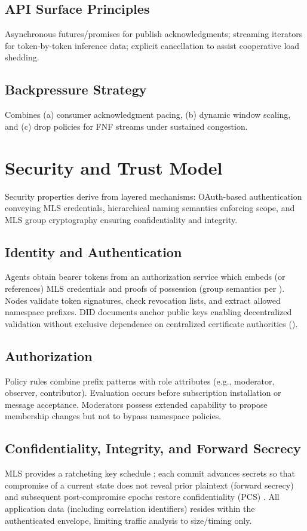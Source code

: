 \documentclass{article}
\theoremstyle{definition}
\theoremstyle{remark}
\begin{document}
\subsection{API Surface Principles}
Asynchronous futures/promises for publish acknowledgments; streaming iterators
for token-by-token inference data; explicit cancellation to assist cooperative
load shedding.
\subsection{Backpressure Strategy}
Combines (a) consumer acknowledgment pacing, (b) dynamic window scaling, and
(c) drop policies for FNF streams under sustained congestion.

\section{Security and Trust Model}\label{sec:security}
Security properties derive from layered mechanisms: OAuth-based authentication
conveying MLS credentials, hierarchical naming semantics enforcing scope, and
MLS group cryptography ensuring confidentiality and integrity.
\subsection{Identity and Authentication}
Agents obtain bearer tokens from an authorization service which embeds (or
references) MLS credentials and proofs of possession (group semantics per
\citep{rfc9420}). Nodes validate token signatures, check revocation lists,
and extract allowed namespace prefixes. DID documents anchor public keys
enabling decentralized validation without exclusive dependence on centralized
certificate authorities (\citep{didcore,didmethods}).
\subsection{Authorization}
Policy rules combine prefix patterns with role attributes (e.g., moderator,
observer, contributor). Evaluation occurs before subscription installation or
message acceptance. Moderators possess extended capability to propose
membership changes but not to bypass namespace policies.
\subsection{Confidentiality, Integrity, and Forward Secrecy}
MLS provides a ratcheting key schedule \citep{rfc9420}; each commit advances
secrets so that compromise of a current state does not reveal prior plaintext
(forward secrecy) and subsequent post-compromise epochs restore
confidentiality (PCS) \citep{rfc9750}. All application data (including
correlation identifiers) resides within the authenticated envelope, limiting
traffic analysis to size/timing only.
\end{document}
